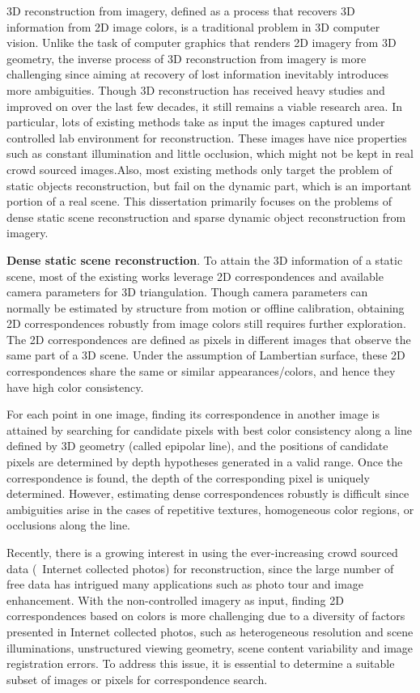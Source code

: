 3D reconstruction from imagery, defined as a process that recovers 3D information from 2D image colors, is a traditional problem in 3D computer vision.
Unlike the task of computer graphics that renders 2D imagery from 3D geometry, the inverse process of 3D reconstruction from imagery is more challenging since aiming at recovery of lost information inevitably introduces more ambiguities. Though 3D reconstruction has received heavy studies and improved on over the last few decades, it still remains a viable research area. 
In particular, lots of existing methods take as input the images captured under controlled lab environment for reconstruction. These images have nice properties such as constant illumination and little occlusion, which might not be kept in real crowd sourced images.Also, most existing methods only target the problem of static objects reconstruction, but fail on the dynamic part, which is an important portion of a real scene. 
This dissertation primarily focuses on the problems of dense static scene reconstruction and sparse dynamic object reconstruction from imagery.

\textbf{Dense static scene reconstruction}.
To attain the 3D information of a static scene, most of the existing works leverage 2D correspondences and available camera parameters for 3D triangulation. Though camera parameters can normally be estimated by structure from motion or offline calibration, obtaining 2D correspondences robustly from image colors still requires further exploration. The 2D correspondences are defined as pixels in different images that observe the same part of a 3D scene. Under the assumption of Lambertian surface, these 2D correspondences share the same or similar appearances/colors, and hence they have high color consistency.

For each point in one image, finding its correspondence in another image is attained by searching for candidate pixels with best color consistency along a line defined by 3D geometry (called epipolar line), and the positions of candidate pixels are determined by depth hypotheses generated in a valid range. Once the correspondence is found, the depth of the corresponding pixel is uniquely determined. However, estimating dense correspondences robustly is difficult since ambiguities arise in the cases of repetitive textures, homogeneous color regions, or occlusions along the line. 

Recently, there is a growing interest in using the ever-increasing crowd sourced data (\ie~Internet collected photos) for reconstruction, since the large number of free data has intrigued many applications such as photo tour and image enhancement. With the non-controlled imagery as input, finding 2D correspondences based on colors is more challenging due to a diversity of factors presented in Internet collected photos, such as heterogeneous resolution and scene illuminations, unstructured viewing geometry, scene content variability and image registration errors. To address this issue, it is essential to determine a suitable subset of images or pixels for correspondence search. 


